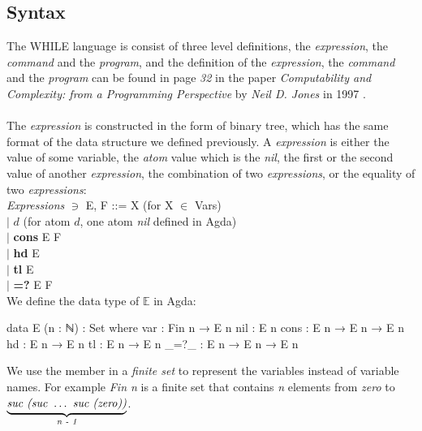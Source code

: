 \documentclass{jfrarticle}
\begin{document}
\subsection{Syntax}
The WHILE language is consist of three level definitions, the \textit{expression}, the \textit{command} and the \textit{program}, 
and the definition of the \textit{expression}, the \textit{command} and the \textit{program} can be found in page \textit{32} in the paper \textit{Computability and Complexity: from a Programming Perspective} by \textit{Neil D. Jones} in 1997 \cite{jones_computability_1997}.\\\\
The \textit{expression} is constructed in the form of binary tree, which has the same format of the data structure we defined previously.
A \textit{expression} is either the value of some variable, the \textit{atom} value which is the \textit{nil}, the first or the second value of another \textit{expression}, the combination of two \textit{expressions}, or the equality of two \textit{expressions}:\\
\textit{Expressions} \hspace{0.3cm}$\ni$\hspace{0.3cm} E, F\hspace{0.1cm} ::= X \hspace{0.98cm}(for X $\in$ Vars)\\
\indent\hspace{3.9cm}$|$ $d$\hspace{1cm} (for atom $d$, one atom \textit{nil} defined in Agda)\\
\indent\hspace{3.9cm}$|$ \textbf{cons} E F\\
\indent\hspace{3.9cm}$|$ \textbf{hd} E\\
\indent\hspace{3.9cm}$|$ \textbf{tl} E\\
\indent\hspace{3.9cm}$|$ \textbf{=?} E F\\
We define the data type of $\mathds{E}$ in Agda:
\begin{code}[fontsize=\small]
data E (n : ℕ) : Set where
  var  : Fin n → E n
  nil  : E n
  cons : E n → E n → E n
  hd   : E n → E n
  tl   : E n → E n
  _=?_ : E n → E n → E n
\end{code}
We use the member in a \textit{finite set} to represent the variables instead of variable names. 
For example \textit{Fin n} is a finite set that contains \textit{n} elements from \textit{zero} to $\underbrace{\mbox{\textit{suc (suc }} \dots \mbox{\textit{ suc (zero))}}}_{\textit{n - 1}}$.
\end{document}
